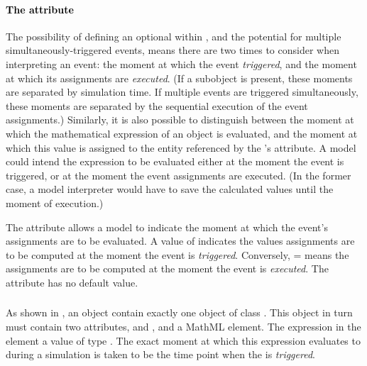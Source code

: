 \paragraph{\textcolor{black}{The  attribute}}
\label{sec:event-usevaluesfromtriggertime}

The possibility of defining an optional \Delay within \Event, and
the potential for multiple simultaneously-triggered events, means
there are two times to consider when interpreting an event: the
moment at which the event \emph{triggered}, and the moment at
which its assignments are \emph{executed}.  (If a \Delay subobject
is present, these moments are separated by simulation time.  If
multiple events are triggered simultaneously, these moments are
separated by the sequential execution of the event assignments.)
Similarly, it is also possible to distinguish between the moment at
which the mathematical expression of an \EventAssignment object is
evaluated, and the moment at which this value is assigned to the
entity referenced by the \EventAssignment's 
attribute.  A model could intend the \EventAssignment expression
to be evaluated either at the moment the event is triggered, or at
the moment the event assignments are executed.  (In the former case,
a model interpreter would have to save the calculated values until
the moment of execution.)

The attribute  allows a model to
indicate the moment at which the event's assignments are to be
evaluated.  A value of  indicates the values assignments
are to be computed at the moment the event is \emph{triggered}.
Conversely, = means the
assignments are to be computed at the moment the event is
\emph{executed}.  The attribute has no default value.


\subsubsection{}
\label{sec:trigger}
\label{sec:event-trigger}

As shown in , an \Event object  contain
exactly one object of class \Trigger.  This object in turn must
contain two attributes,  and
, and a MathML  element.
The expression in the  element  a
value of type .  The exact moment at which this
expression evaluates to  during a simulation is taken to
be the time point when the \Event is \emph{triggered}.

